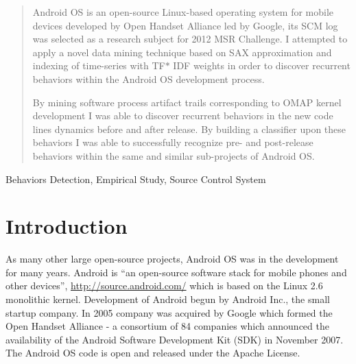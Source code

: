 \documentclass[10pt, conference, compsocconf]{IEEEtran}
\begin{document}
\maketitle


\begin{abstract}
Android OS is an open-source Linux-based operating system for mobile devices developed by 
Open Handset Alliance led by Google, its SCM log was selected as a research subject for 
2012 MSR Challenge.
I attempted to apply a novel data mining technique based on SAX approximation and indexing 
of time-series with TF$\ast$ IDF weights in order to discover recurrent behaviors within 
the Android OS development process. 

By mining software process artifact trails corresponding to OMAP kernel development 
I was able to discover recurrent behaviors in the new code lines dynamics before and after
release. By building a classifier upon these behaviors I was able to successfully recognize 
pre- and post-release behaviors within the same and similar sub-projects of Android OS.
\end{abstract}

\begin{IEEEkeywords}
Behaviors Detection, Empirical Study, Source Control System

\end{IEEEkeywords}


%
\IEEEpeerreviewmaketitle



\section{Introduction}
As many other large open-source projects, Android OS was in the development for many years. 
Android is ``an open-source software stack for mobile phones and other devices'',
\url{http://source.android.com/} which is based on the Linux 2.6 monolithic kernel.
Development of Android begun by Android Inc., the small startup company.
In 2005 company was acquired by Google which formed the Open Handset Alliance - a consortium of 84 companies 
which announced the availability of the Android Software Development Kit (SDK) 
in November 2007. The Android OS code is open and released under the Apache License.
\end{document}
